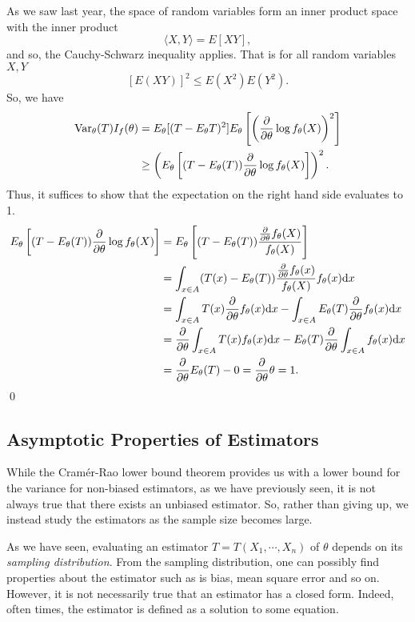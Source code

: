 \documentclass[
]{article}
\theoremstyle{definition}
\theoremstyle{definition}
\begin{document}
As we saw last year, the space of random variables form an inner product
space with the inner product \[\langle X, Y \rangle = E[XY],\] and so,
the Cauchy-Schwarz inequality applies. That is for all random variables
\(X, Y\) \[[E(XY)]^2 \le E(X^2)E(Y^2).\] So, we have \[\begin{split}
    {\mathop{\mathrm{Var}}}_\theta(T) I_f(\theta) & = E_\theta[(T - E_\theta T)^2] 
      E_\theta\left[\left(\pdv{\theta}\log f_\theta(X)\right)^2\right]\\
      & \ge \left(E_\theta\left[(T - E_\theta(T)) \pdv{\theta}\log f_\theta(X) \right]\right)^2.
    \end{split}\] Thus, it suffices to show that the expectation on the
right hand side evaluates to 1. \[\begin{split}
    E_\theta\left[(T - E_\theta(T)) \pdv{\theta}\log f_\theta(X) \right] & =
      E_\theta\left[(T - E_\theta(T)) \frac{\pdv{\theta}f_\theta(X)}{f_\theta(X)}\right]\\
      & = \int_{x \in A} (T(x) - E_\theta(T))\frac{\pdv{\theta}f_\theta(x)}{f_\theta(X)} f_\theta(x) \dd x\\
      & = \int_{x \in A} T(x) \pdv{\theta}f_\theta(x) \dd x - \int_{x \in A} E_\theta(T) \pdv{\theta}f_\theta(x) \dd x\\
      & = \pdv{\theta} \int_{x \in A} T(x) f_\theta(x) \dd x - E_\theta(T) \pdv{\theta} \int_{x \in A} f_\theta(x) \dd x\\
      & = \pdv{\theta} E_\theta(T) - 0 = \pdv{\theta}\theta = 1.
   \end{split}\] \qed

\hypertarget{asymptotic-properties-of-estimators}{%
\subsection{Asymptotic Properties of
Estimators}\label{asymptotic-properties-of-estimators}}

While the Cramér-Rao lower bound theorem provides us with a lower bound
for the variance for non-biased estimators, as we have previously seen,
it is not always true that there exists an unbiased estimator. So,
rather than giving up, we instead study the estimators as the sample
size becomes large.

As we have seen, evaluating an estimator \(T = T(X_1, \cdots, X_n)\) of
\(\theta\) depends on its \emph{sampling distribution}. From the
sampling distribution, one can possibly find properties about the
estimator such as is bias, mean square error and so on. However, it is
not necessarily true that an estimator has a closed form. Indeed, often
times, the estimator is defined as a solution to some equation.
\end{document}
